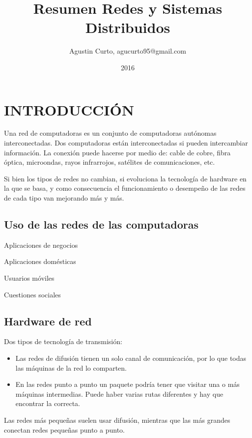 \documentclass[10pt,a4paper]{report}
\author{Agustin Curto, agucurto95@gmail.com}
\title{Resumen Redes y Sistemas Distribuidos}
\date{2016}
\begin{document}
\maketitle
\tableofcontents

\chapter{INTRODUCCIÓN}

	\par Una red de computadoras es un conjunto de computadoras autónomas 
interconectadas. Dos computadoras están interconectadas si pueden intercambiar 
información. La conexión puede hacerse por medio de: cable de cobre, fibra óptica, 
microondas, rayos infrarrojos, satélites de comunicaciones, etc.

	\par Si bien los tipos de redes no cambian, si evoluciona la tecnología de hardware en 
la que se basa, y como consecuencia el funcionamiento o desempeño de las redes de 
cada tipo van mejorando más y más.

\section{Uso de las redes de las computadoras}
\par Aplicaciones de negocios
\par Aplicaciones domésticas
\par Usuarios móviles
\par Cuestiones sociales

\section{Hardware de red}
\par Dos tipos de tecnología de transmisión:
	\begin{itemize}
		\item Las redes de difusión tienen un solo canal de comunicación, por lo que 
		todas las máquinas de la red lo comparten.
		\item En las redes punto a punto un paquete podría tener que visitar una o más 
		máquinas intermedias. Puede haber varias rutas diferentes y hay que encontrar la 
		correcta.
	\end{itemize}
\par Las redes más pequeñas suelen usar difusión, mientras que las más grandes 
conectan redes pequeñas punto a punto.
\end{document}
